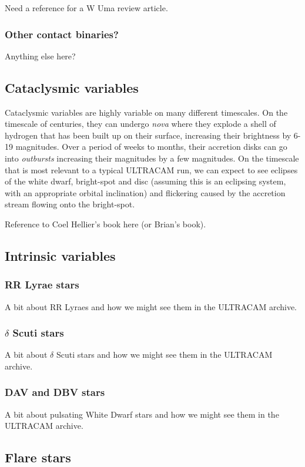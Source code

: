 Need a reference for a W Uma review article.

\subsubsection{Other contact binaries?}
Anything else here?

\subsection{Cataclysmic variables}
Cataclysmic variables are highly variable on many different timescales. On the timescale of centuries, they can undergo \emph{nova} where they explode a shell of hydrogen that has been built up on their surface, increasing their brightness by 6-19 magnitudes. Over a period of weeks to months, their accretion disks can go into \emph{outbursts} increasing their magnitudes by a few magnitudes. On the timescale that is most relevant to a typical ULTRACAM run, we can expect to see eclipses of the white dwarf, bright-spot and disc (assuming this is an eclipsing system, with an appropriate orbital inclination) and flickering caused by the accretion stream flowing onto the bright-spot. 

Reference to Coel Hellier's book here (or Brian's book). 

\subsection{Intrinsic variables}

\subsubsection{RR Lyrae stars}
A bit about RR Lyraes and how we might see them in the ULTRACAM archive.

\subsubsection{$\delta$ Scuti stars}
A bit about $\delta$ Scuti stars and how we might see them in the ULTRACAM archive.

\subsubsection{DAV and DBV stars}
A bit about pulsating White Dwarf stars and how we might see them in the ULTRACAM archive.

\subsection{Flare stars}

